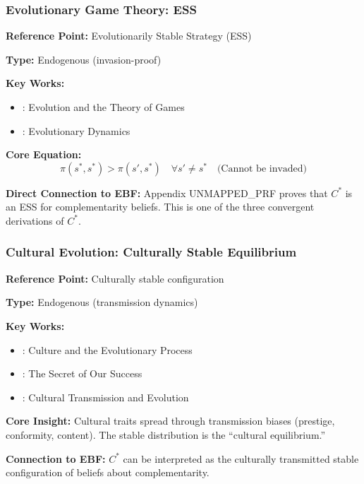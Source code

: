 \subsubsection{Evolutionary Game Theory: ESS}

\begin{tcolorbox}[colback=gray!5!white, colframe=gray!75!black]
\textbf{Reference Point:} Evolutionarily Stable Strategy (ESS)

\textbf{Type:} Endogenous (invasion-proof)

\textbf{Key Works:}
\begin{itemize}[nosep]
    \item \citet{maynardsmith1982}: Evolution and the Theory of Games
    \item \citet{nowak2006}: Evolutionary Dynamics
\end{itemize}

\textbf{Core Equation:}
\begin{equation}
\pi(s^*, s^*) > \pi(s', s^*) \quad \forall s' \neq s^* \quad \text{(Cannot be invaded)}
\end{equation}

\textbf{Direct Connection to EBF:}
Appendix UNMAPPED_PRF proves that $C^*$ is an ESS for complementarity beliefs.
This is one of the three convergent derivations of $C^*$.
\end{tcolorbox}

\subsubsection{Cultural Evolution: Culturally Stable Equilibrium}

\begin{tcolorbox}[colback=gray!5!white, colframe=gray!75!black]
\textbf{Reference Point:} Culturally stable configuration

\textbf{Type:} Endogenous (transmission dynamics)

\textbf{Key Works:}
\begin{itemize}[nosep]
    \item \citet{boydricherson}: Culture and the Evolutionary Process
    \item \citet{henrich2015}: The Secret of Our Success
    \item \citet{cavallisforza1981}: Cultural Transmission and Evolution
\end{itemize}

\textbf{Core Insight:}
Cultural traits spread through transmission biases (prestige, conformity, content).
The stable distribution is the ``cultural equilibrium.''

\textbf{Connection to EBF:}
$C^*$ can be interpreted as the culturally transmitted stable configuration
of beliefs about complementarity.
\end{tcolorbox}


